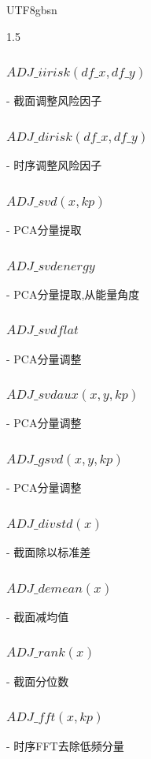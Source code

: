 \documentclass{article}
\begin{document}
\begin{CJK}{UTF8}{gbsn}
\begin{spacing}{1.5}
 \subsubsection{$ADJ\_iirisk(df\_x, df\_y)$}             
   - 截面调整风险因子  
 \subsubsection{$ADJ\_dirisk(df\_x, df\_y)$}             
   - 时序调整风险因子  
 \subsubsection{$ADJ\_svd(x, kp)$}                     
   - PCA分量提取  
 \subsubsection{$ADJ\_svdenergy$}
   - PCA分量提取,从能量角度  
 \subsubsection{$ADJ\_svdflat$}
   - PCA分量调整
 \subsubsection{$ADJ\_svdaux(x, y, kp)$}               
   - PCA分量调整
 \subsubsection{$ADJ\_gsvd(x, y, kp)$}                 
   - PCA分量调整  
 \subsubsection{$ADJ\_divstd(x)$}                      
   - 截面除以标准差  
 \subsubsection{$ADJ\_demean(x)$}                      
   - 截面减均值  
 \subsubsection{$ADJ\_rank(x)$}                        
   - 截面分位数  
 \subsubsection{$ADJ\_fft(x, kp)$}                     
   - 时序FFT去除低频分量   


\end{spacing}
\end{CJK}
\end{document}
